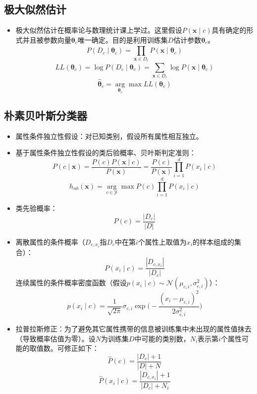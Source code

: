 \documentclass{ctexart}
\begin{document}
				\subsection{极大似然估计}
					\begin{itemize}
						\item 极大似然估计在概率论与数理统计课上学过。这里假设$P(\bm{x}\mid c)$具有确定的形式并且被参数向量$\bm{\theta}_c$唯一确定。目的是利用训练集$D$估计参数$\bm{\theta}_c$。\[P(D_c\mid\bm{\theta}_c)=\prod_{\bm{x}\in D_c}^{}P(\bm{x}\mid\bm{\theta}_c)\]\[LL(\bm{\theta}_c)=\log P(D_c\mid\bm{\theta}_c)=\sum_{\bm{x}\in D_c}^{}\log P(\bm{x}\mid\bm{\theta}_c)\]\[\hat{\bm{\theta}}_c=\arg\limits_{\bm{\theta}_c}\max LL(\bm{\theta}_c)\]
					\end{itemize}
				\subsection{朴素贝叶斯分类器}
					\begin{itemize}
						\item 属性条件独立性假设：对已知类别，假设所有属性相互独立。
						\item 基于属性条件独立性假设的类后验概率、贝叶斯判定准则：\[P(c\mid\bm{x})=\frac{P(c)P(\bm{x}\mid c)}{P(\bm{x})}=\frac{P(c)}{P(\bm{x})}\prod_{i=1}^{d}P(x_i\mid c)\]\[h_{nb}(\bm{x})=\arg\limits_{c\in\mathcal{Y}}\max P(c)\prod_{i=1}^{d}P(x_i\mid c)\]
						\item 类先验概率：\[P(c)=\frac{|D_c|}{|D|}\]
						\item 离散属性的条件概率（$D_{c,x_i}$指$D_c$中在第$i$个属性上取值为$x_i$的样本组成的集合）：\[P(x_i\mid c)=\frac{|D_{c,x_i}|}{|D_c|}\]连续属性的条件概率密度函数（假设$p(x_i\mid c)\sim\mathcal{N}(\mu_{c,i},\sigma_{c,i}^2)$）：\[p(x_i\mid c)=\frac{1}{\sqrt{2\pi}}\sigma_{c,i}\exp\bigg(-\frac{(x_i-\mu_{c,i})^2}{2\sigma_{c,i}^2}\bigg)\]
						\item 拉普拉斯修正：为了避免其它属性携带的信息被训练集中未出现的属性值抹去（导致概率估值为零）。设$N$为训练集$D$中可能的类别数，$N_i$表示第$i$个属性可能的取值数。可修正如下：\[\hat{P}(c)=\frac{|D_c|+1}{|D|+N}\]\[\hat{P}(x_i\mid c)=\frac{|D_{c,x_i}|+1}{|D_c|+N_i}\]
					\end{itemize}
\end{document}
